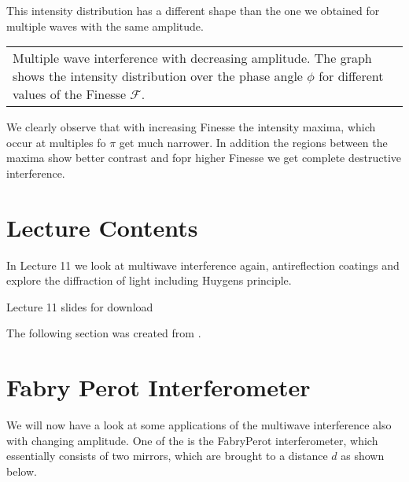 \documentclass[letterpaper,10pt,english]{sphinxmanual}
\let\sphinxpxdimen\pdfpxdimen\else\newdimen\sphinxpxdimen
\begin{document}
This intensity distribution has a different shape than the one we obtained for multiple waves with the same amplitude.


\begin{savenotes}\sphinxattablestart
\centering
\begin{tabulary}{\linewidth}[t]{|T|}
\hline
\sphinxstyletheadfamily 
{}
\\
\hline
{} Multiple wave interference with decreasing amplitude. The graph shows the intensity distribution over the phase angle \(\phi\) for different values of the Finesse \(\mathcal{F}\).
\\
\hline
\end{tabulary}
\par
\sphinxattableend\end{savenotes}

We clearly observe that with increasing Finesse the intensity maxima, which occur at multiples fo \(\pi\) get much narrower. In addition the regions between the maxima show better contrast and fopr higher Finesse we get complete destructive interference.


\section{Lecture Contents}
\label{\detokenize{lectures/L11/overview_11:lecture-contents}}\label{\detokenize{lectures/L11/overview_11::doc}}
In Lecture 11 we look at multi\sphinxhyphen{}wave interference again, anti\sphinxhyphen{}reflection coatings and explore the diffraction of light including Huygens principle.

\noindent\sphinxincludegraphics[width=600\sphinxpxdimen]{{slides2}.png}

Lecture 11 slides for download 

The following section was created from .


\section{Fabry Perot Interferometer}
\label{\detokenize{notebooks/L11/Interference:Fabry-Perot-Interferometer}}\label{\detokenize{notebooks/L11/Interference::doc}}


We will now have a look at some applications of the multiwave interference also with changing amplitude. One of the is the Fabry\sphinxhyphen{}Perot interferometer, which essentially consists of two mirrors, which are brought to a distance \(d\) as shown below.
\end{document}

